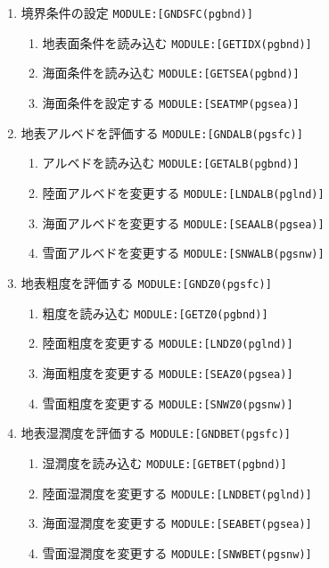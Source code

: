 \begin{enumerate}
\item 境界条件の設定 \texttt{MODULE:[GNDSFC(pgbnd)]}
      \begin{enumerate}
      \item 地表面条件を読み込む \texttt{MODULE:[GETIDX(pgbnd)]}
      \item 海面条件を読み込む \texttt{MODULE:[GETSEA(pgbnd)]}
      \item 海面条件を設定する \texttt{MODULE:[SEATMP(pgsea)]}
      \end{enumerate}
\item 地表アルベドを評価する \texttt{MODULE:[GNDALB(pgsfc)]}
      \begin{enumerate}
      \item アルベドを読み込む \texttt{MODULE:[GETALB(pgbnd)]}
      \item 陸面アルベドを変更する \texttt{MODULE:[LNDALB(pglnd)]}
      \item 海面アルベドを変更する \texttt{MODULE:[SEAALB(pgsea)]}
      \item 雪面アルベドを変更する \texttt{MODULE:[SNWALB(pgsnw)]}
      \end{enumerate}
\item 地表粗度を評価する \texttt{MODULE:[GNDZ0(pgsfc)]}
      \begin{enumerate}
      \item 粗度を読み込む \texttt{MODULE:[GETZ0(pgbnd)]}
      \item 陸面粗度を変更する \texttt{MODULE:[LNDZ0(pglnd)]}
      \item 海面粗度を変更する \texttt{MODULE:[SEAZ0(pgsea)]}
      \item 雪面粗度を変更する \texttt{MODULE:[SNWZ0(pgsnw)]}
      \end{enumerate}
\item 地表湿潤度を評価する \texttt{MODULE:[GNDBET(pgsfc)]} \\
      \begin{enumerate}
      \item 湿潤度を読み込む \texttt{MODULE:[GETBET(pgbnd)]}
      \item 陸面湿潤度を変更する \texttt{MODULE:[LNDBET(pglnd)]}
      \item 海面湿潤度を変更する \texttt{MODULE:[SEABET(pgsea)]}
      \item 雪面湿潤度を変更する \texttt{MODULE:[SNWBET(pgsnw)]}
      \end{enumerate}
\end{enumerate}

